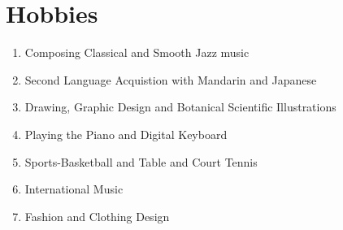 \documentclass{TMLSStyleGuideResumeVitae}
\begin{document}
\section{Hobbies}

\begin{enumerate}
\item Composing Classical and Smooth Jazz music
\item Second Language Acquistion with Mandarin and Japanese
\item Drawing, Graphic Design and Botanical Scientific Illustrations
\item Playing the Piano and Digital Keyboard 
\item Sports-Basketball and Table and Court Tennis
\item International Music
\item Fashion and Clothing Design
\end{enumerate}
\end{document}
